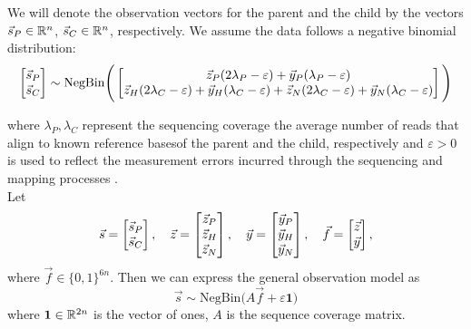 We will denote the observation vectors for the parent and the child by the vectors $\vec{s}_P \in \mathbb{R}^n$, $\vec{s}_C \in \mathbb{R}^n$, respectively. We assume the data follows a negative binomial distribution:
\begin{equation} \label{observational_model}
	\begin{bmatrix}
		\vec{s}_P \\
		\vec{s}_C
	\end{bmatrix}
	\sim \text{NegBin}
	\Bigg( \begin{bmatrix}
		\vec{z}_P (2 \lambda_P - \varepsilon) + \vec{y}_P (\lambda_P - \varepsilon) \\
		\vec{z}_H (2 \lambda_C - \varepsilon) + \vec{y}_H (\lambda_C - \varepsilon) + \vec{z}_N (2 \lambda_C - \varepsilon) + \vec{y}_N (\lambda_C - \varepsilon) \\
	\end{bmatrix} \Bigg)
\end{equation}

where $\lambda_P, \lambda_C$ represent the sequencing coverage \textemdash the average number of reads that align to known reference bases\textemdash of the parent and the child, respectively  and $\varepsilon >0$ is used to reflect the measurement errors incurred through the sequencing and mapping processes \cite{MB_diploidTrios, lazar_2021}. \\
Let 
$$
\vec{s} = \begin{bmatrix}
	\sP \\ \sC %
\end{bmatrix}, \quad 
\vec{z} = \begin{bmatrix}
	\zP \\ \zH \\ \zN
\end{bmatrix}, \quad 
\vec{y} = \begin{bmatrix}
	\yP \\ \yH \\ \yN
\end{bmatrix}, \quad  
\vec{f} = \begin{bmatrix}
	\vec{z} \\ \vec{y}
\end{bmatrix}, 
$$
where $\vec{f} \in \{0,1\}^{6n}$. Then we can express the general observation model as
$$ \vec{s} \sim \text{NegBin}(A \vec{f} + \varepsilon \mathbf{1)}$$
where $\mathbf{1} \in \mathbb{R}^{2n}$ is the vector of ones, $A$ is the sequence coverage matrix. 

